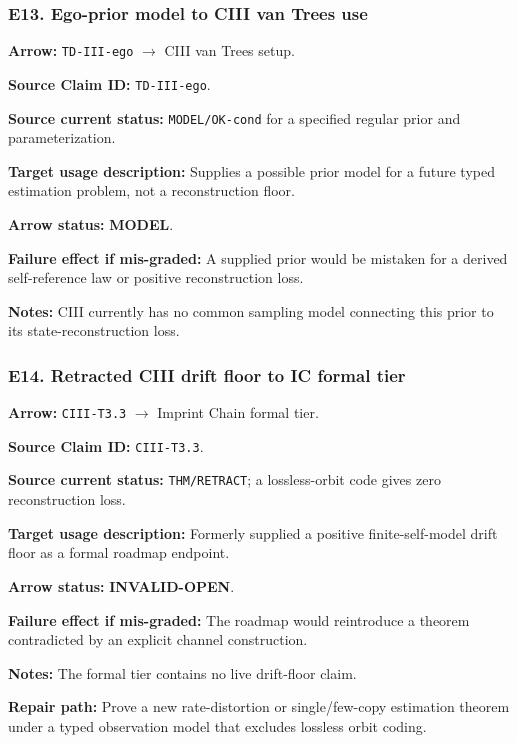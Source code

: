 \documentclass[12pt,a4paper]{article}
\begin{document}
\subsubsection*{E13. Ego-prior model to CIII van Trees use}
\noindent\textbf{Arrow:} \texttt{TD-III-ego}
\(\to\) CIII van Trees setup.\par
\noindent\textbf{Source Claim ID:} \texttt{TD-III-ego}.\par
\noindent\textbf{Source current status:} \texttt{MODEL/OK-cond} for a
specified regular prior and parameterization.\par
\noindent\textbf{Target usage description:} Supplies a possible prior
model for a future typed estimation problem, not a reconstruction floor.\par
\noindent\textbf{Arrow status:} \textbf{MODEL}.\par
\noindent\textbf{Failure effect if mis-graded:} A supplied prior would be
mistaken for a derived self-reference law or positive reconstruction
loss.\par
\noindent\textbf{Notes:} CIII currently has no common sampling model
connecting this prior to its state-reconstruction loss.\par

\subsubsection*{E14. Retracted CIII drift floor to IC formal tier}
\noindent\textbf{Arrow:} \texttt{CIII-T3.3}
\(\to\) Imprint Chain formal tier.\par
\noindent\textbf{Source Claim ID:} \texttt{CIII-T3.3}.\par
\noindent\textbf{Source current status:} \texttt{THM/RETRACT}; a
lossless-orbit code gives zero reconstruction loss.\par
\noindent\textbf{Target usage description:} Formerly supplied a positive
finite-self-model drift floor as a formal roadmap endpoint.\par
\noindent\textbf{Arrow status:} \textbf{INVALID-OPEN}.\par
\noindent\textbf{Failure effect if mis-graded:} The roadmap would
reintroduce a theorem contradicted by an explicit channel construction.\par
\noindent\textbf{Notes:} The formal tier contains no live drift-floor
claim.\par
\noindent\textbf{Repair path:} Prove a new rate-distortion or
single/few-copy estimation theorem under a typed observation model that
excludes lossless orbit coding.\par
\end{document}
